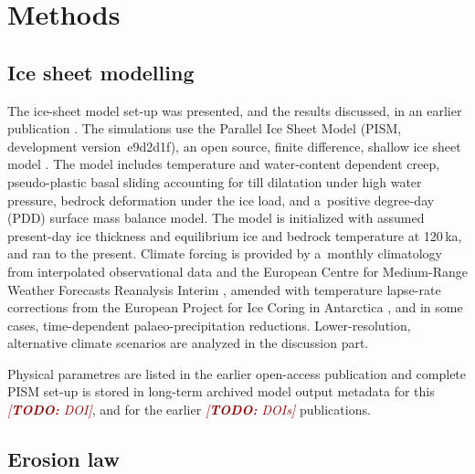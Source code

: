 \documentclass[utf8]{article}
\newcommand{\todo}[1]{\textcolor{darkred}{\emph{[\textbf{TODO:} #1]}}}
\begin{document}
\section{Methods}

\subsection{Ice sheet modelling}

    The ice-sheet model set-up was presented, and the results discussed, in an
    earlier publication \citep{Seguinot.etal.2018}. The simulations use the
    Parallel Ice Sheet Model (PISM, development version~e9d2d1f), an open
    source, finite difference, shallow ice sheet model
    \citep{PISM-authors.2017}. The model includes temperature and water-content
    dependent creep, pseudo-plastic basal sliding accounting for till
    dilatation under high water pressure, bedrock deformation under the ice
    load, and a~positive degree-day (PDD) surface mass balance model. The model
    is initialized with assumed present-day ice thickness and equilibrium
    ice and bedrock temperature at 120\,ka, and ran to the present.
    Climate forcing is provided by a~monthly climatology from interpolated
    observational data \citep[WorldClim;][]{Hijmans.etal.2005} and the European
    Centre for Medium-Range Weather Forecasts Reanalysis Interim
    \citep[ERA-Interim;][]{Dee.etal.2011}, amended with temperature lapse-rate
    corrections from the European Project for Ice Coring in Antarctica
    \citep[EPICA;][] {Jouzel.etal.2007}, and in some cases, time-dependent
    palaeo-precipitation reductions. Lower-resolution, alternative climate
    scenarios are analyzed in the discussion part.

    Physical parametres are listed in the earlier open-access publication
    \citep{Seguinot.etal.2018} and complete PISM set-up is stored in long-term
    archived model output metadata for this \todo{DOI}, and for the earlier
    \todo{DOIs} publications.

\subsection{Erosion law}
\end{document}
